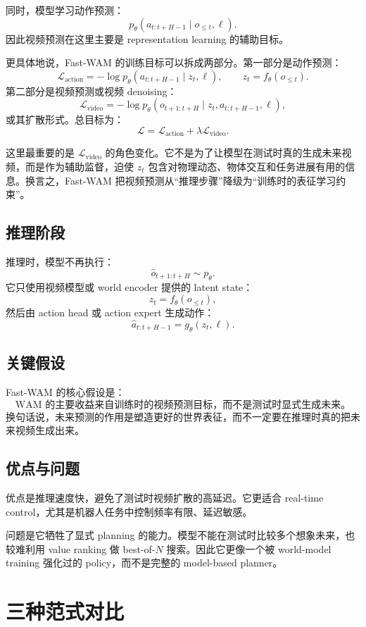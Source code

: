 \documentclass[11pt,a4paper]{ctexart}
\begin{document}
同时，模型学习动作预测：
\[
  p_\theta(a_{t:t+H-1}\mid o_{\le t},\ell).
\]
因此视频预测在这里主要是 representation learning 的辅助目标。

更具体地说，Fast-WAM 的训练目标可以拆成两部分。第一部分是动作预测：
\[
  \mathcal{L}_{\mathrm{action}}
  =
  -\log p_\theta(a_{t:t+H-1}\mid z_t,\ell),
  \qquad
  z_t=f_\theta(o_{\le t}).
\]
第二部分是视频预测或视频 denoising：
\[
  \mathcal{L}_{\mathrm{video}}
  =
  -\log p_\theta(o_{t+1:t+H}\mid z_t,a_{t:t+H-1},\ell),
\]
或其扩散形式。总目标为：
\[
  \mathcal{L}
  =
  \mathcal{L}_{\mathrm{action}}
  +
  \lambda\mathcal{L}_{\mathrm{video}}.
\]

这里最重要的是 $\mathcal{L}_{\mathrm{video}}$ 的角色变化。它不是为了让模型在测试时真的生成未来视频，而是作为辅助监督，迫使 $z_t$ 包含对物理动态、物体交互和任务进展有用的信息。换言之，Fast-WAM 把视频预测从“推理步骤”降级为“训练时的表征学习约束”。

\subsection{推理阶段}

推理时，模型不再执行：
\[
  \hat{o}_{t+1:t+H}\sim p_\theta.
\]
它只使用视频模型或 world encoder 提供的 latent state：
\[
  z_t=f_\theta(o_{\le t}),
\]
然后由 action head 或 action expert 生成动作：
\[
  \hat{a}_{t:t+H-1}=g_\theta(z_t,\ell).
\]

\subsection{关键假设}

Fast-WAM 的核心假设是：
\[
  \text{WAM 的主要收益来自训练时的视频预测目标，而不是测试时显式生成未来。}
\]
换句话说，未来预测的作用是塑造更好的世界表征，而不一定要在推理时真的把未来视频生成出来。

\subsection{优点与问题}

优点是推理速度快，避免了测试时视频扩散的高延迟。它更适合 real-time control，尤其是机器人任务中控制频率有限、延迟敏感。

问题是它牺牲了显式 planning 的能力。模型不能在测试时比较多个想象未来，也较难利用 value ranking 做 best-of-$N$ 搜索。因此它更像一个被 world-model training 强化过的 policy，而不是完整的 model-based planner。

\section{三种范式对比}
\end{document}
